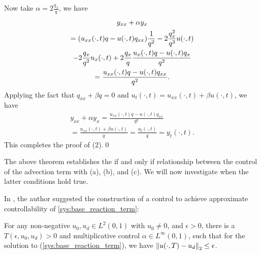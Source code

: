 \documentclass{ifacconf}
\def\RG{}
\begin{document}
\begin{thm}
\begin{pf}
    Now take $\alpha = 2\frac{q_x}{q}$, we have 
    \begin{multline*}
        y_{xx} + \alpha y_x\\
        =  {\left ( u_{xx}(\cdot, t)q - u(\cdot, t)q_{xx} \right )}\frac{1}{q^2} - 2\frac{q_x^2}{q^3}u(\cdot, t)\\
        - 2\frac{q_x}{q^2}u_x(\cdot, t) + 2\frac{q_x}{q}\frac{u_x(\cdot, t)q - u(\cdot, t)q_x}{q^2}\\
        = \frac{u_{xx}(\cdot, t)q - u(\cdot, t)q_{xx}}{q^2}.
    \end{multline*}
    Applying the fact that $q_{xx} + \beta q = 0$ and $u_t(\cdot, t) = u_{xx}(\cdot, t) + \beta u(\cdot, t)$, we have 
 \RG{   \begin{multline*}
        y_{xx} + \alpha y_x = \frac{u_{xx}(\cdot, t)q - u(\cdot, t)q_{xx}}{q^2}\\
        = \frac{u_{xx}(\cdot, t) + \beta u(\cdot, t)}{q}
        = \frac{u_t(\cdot, t)}{q}
        = y_t(\cdot, t).
    \end{multline*}
    }
    This completes the proof of (2).\qed
\end{pf}
\end{thm}

The above theorem establishes the if and only if relationship between the control of the advection term with (a), (b), and (c). We will now investigate when the latter conditions hold true.

In \cite{khapalov_alexander_y_global_2002}, the author
suggested the construction of a control to achieve approximate controllability of \eqref{sys:base_reaction_term}:    
\begin{thm}
\label{khapalov: reaction control 1D}
    For any non-negative $u_0,u_d \in L^2(0,1)$ with $u_0 \neq 0$, and $\epsilon > 0$, there is a $T(\epsilon, u_0, u_d) > 0$ and multiplicative control $\alpha \in L^\infty(0,1)$, such that for the solution to (\ref{sys:base_reaction_term}), we have ${\left\| u(\cdot, T) - u_d\right\|}_2 \leq \epsilon$.
\end{thm}
\end{document}
